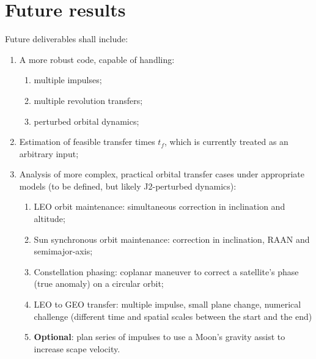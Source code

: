 \section{Future results}

Future deliverables shall include:
\begin{enumerate}
    \item A more robust code, capable of handling: 
    \begin{enumerate}
        \item multiple impulses;
        \item multiple revolution transfers;
        \item perturbed orbital dynamics;
    \end{enumerate}
    \item Estimation of feasible transfer times \(t_f\), which is currently treated as an arbitrary input;
    \item Analysis of more complex, practical orbital transfer cases under appropriate models (to be defined, but likely J2-perturbed dynamics):
    \begin{enumerate}
        \item LEO orbit maintenance: simultaneous correction in inclination and altitude;
        \item Sun synchronous orbit maintenance: correction in inclination, RAAN and semimajor-axis;
        \item Constellation phasing: coplanar maneuver to correct a satellite's phase (true anomaly) on a circular orbit;
        \item LEO to GEO transfer: multiple impulse, small plane change, numerical challenge (different time and spatial scales between the start and the end)
        \item \textbf{Optional}: plan series of impulses to use a Moon's gravity assist to increase scape velocity.
    \end{enumerate}
\end{enumerate}